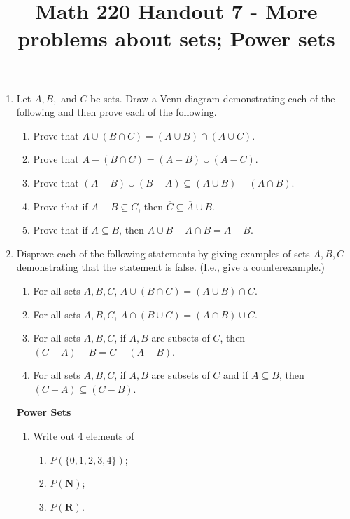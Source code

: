 \documentclass[12pt, reqno]{amsart}
\begin{document}
\title[Math 220 Handout 7 - More problems about sets; Power sets]{Math 220 Handout 7 - More problems about sets; Power sets}\maketitle


\begin{enumerate}
\item Let $A,B,$ and $C$ be sets. Draw a Venn diagram demonstrating each of the following and then prove each of the following.



\begin{enumerate}
\item Prove that $A \cup (B \cap C) = (A\cup B) \cap (A \cup C)$.
\item Prove that $A - (B \cap C) = (A - B) \cup (A - C)$.
\item Prove that $(A - B) \cup (B-A) \subseteq (A \cup B) - (A \cap B)$.
\item Prove that if $A - B \subseteq C$, then $ \overline{C} \subseteq \overline{A} \cup B$.
\item Prove that if $A \subseteq B$, then $A\cup B - A \cap B = A - B$.
\end{enumerate}
\vspace{1cm}

\item Disprove each of the following statements by giving examples of sets
$A,B,C$ demonstrating that the statement is false. (I.e., give a counterexample.)
\begin{enumerate}
\item For all sets $A,B,C$, $A \cup (B \cap C) = (A\cup B) \cap C$.
\item For all sets $A,B,C$, $A \cap (B \cup C) = (A\cap B) \cup C$.
\item For all sets $A,B,C$, if $A,B$ are subsets of $C$, then $(C-A) - B = C-(A-B)$.
\item For all sets $A,B,C$, if $A,B$ are subsets of $C$ and if $A \subseteq B$, then $(C-A) \subseteq (C- B)$.
\end{enumerate}

\newpage
\textbf{Power Sets}\\

\begin{enumerate}
\item Write out 4 elements of
 \begin{enumerate}
 \item $P(\{0,1,2,3,4\})$;
 \item $P(\mathbf{N})$;
 \item $P(\mathbf{R})$.\\
 \end{enumerate}
 \vspace{5cm}


\end{enumerate}
\end{enumerate}
\end{document}
